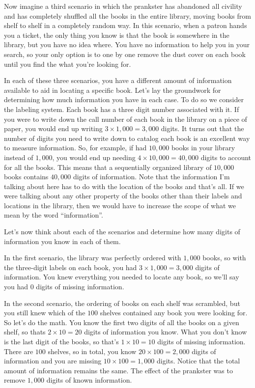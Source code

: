 \documentclass[11pt, oneside]{article}   	%
\begin{document}
Now imagine a third scenario in which the prankster has abandoned all civility
and has completely shuffled all the books in the entire library, moving books
from shelf to shelf in a completely random way.  In this scenario, when a patron
hands you a ticket, the only thing you know is that the book is somewhere in the
library, but you have no idea where.  You have no information to help you in
your search, so your only option is to one by one remove the dust cover on each
book until you find the what you're looking for.

In each of these three scenarios, you have a different amount of information
available to aid in locating a specific book.  Let's lay the groundwork for
determining how much information you have in each case.  To do so we consider
the labeling system.  Each book has a three digit number associated with it.  If
you were to write down the call number of each book in the library on a piece of
paper, you would end up writing $3\times1,000=3,000$ digits.  It turns out that
the number of digits you need to write down to catalog each book is an excellent
way to measure information.  So, for example, if had $10,000$ books in your
library instead of $1,000$, you would end up needing $4\times10,000=40,000$
digits to account for all the books. This means that a sequentially organized
library of $10,000$ books contains $40,000$ digits of information.  Note that
the information I'm talking about here has to do with the location of the books
and that's all.  If we were talking about any other property of the books other
than their labels and locations in the library, then we would have to increase
the scope of what we mean by the word ``information''.

Let's now think about each of the scenarios and determine how many digits of
information you know in each of them.

In the first scenario, the library was perfectly ordered with $1,000$ books, so
with the three-digit labels on each book, you had $3\times1,000=3,000$ digits of
information.  You knew everything you needed to locate any book, so we'll say
you had $0$ digits of missing information.

In the second scenario, the ordering of books on each shelf was scrambled, but
you still knew which of the $100$ shelves contained any book you were looking
for.  So let's do the math. You know the first two digits of all the books on a
given shelf, so thats $2\times10=20$ digits of information you know.  What you
don't know is the last digit of the books, so that's $1\times10=10$ digits of
missing information.  There are $100$ shelves, so in total, you know
$20\times100=2,000$ digits of information and you are missing
$10\times100=1,000$ digits.  Notice that the total amount of
information remains the same.  The effect of the prankster was to remove $1,000$
digits of known information.
\end{document}
